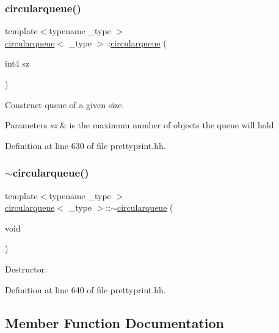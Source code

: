 \subsubsection{\texorpdfstring{circularqueue()}{circularqueue()}}
{\footnotesize\ttfamily template$<$typename \+\_\+type $>$ \\
\mbox{\hyperlink{classcircularqueue}{circularqueue}}$<$ \+\_\+type $>$\+::\mbox{\hyperlink{classcircularqueue}{circularqueue}} (\begin{DoxyParamCaption}\item[{int4}]{sz }\end{DoxyParamCaption})}



Construct queue of a given size. 


\begin{DoxyParams}{Parameters}
{\em sz} & is the maximum number of objects the queue will hold \\
\hline
\end{DoxyParams}


Definition at line 630 of file prettyprint.\+hh.

\mbox{\label{classcircularqueue_aaeebb1a2be28d813c1c8794ae4500dde}} 
\subsubsection{\texorpdfstring{$\sim$circularqueue()}{~circularqueue()}}
{\footnotesize\ttfamily template$<$typename \+\_\+type $>$ \\
\mbox{\hyperlink{classcircularqueue}{circularqueue}}$<$ \+\_\+type $>$\+::$\sim$\mbox{\hyperlink{classcircularqueue}{circularqueue}} (\begin{DoxyParamCaption}\item[{void}]{ }\end{DoxyParamCaption})}



Destructor. 



Definition at line 640 of file prettyprint.\+hh.



\subsection{Member Function Documentation}
\mbox{\label{classcircularqueue_ab91d6ae625706c6ad18f1b5a2e2e238c}} 
